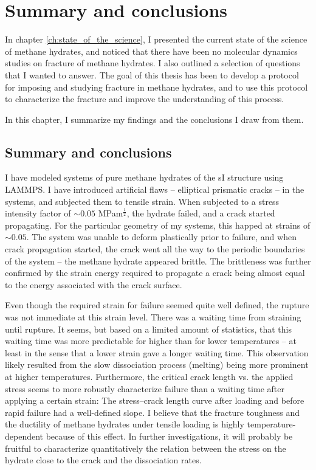 \chapter{Summary and conclusions}
\label{ch:summary_conclusions}
In chapter \ref{ch:state_of_the_science}, I presented the current state of the science of methane hydrates, and noticed that there have been no molecular dynamics studies on fracture of methane hydrates. I also outlined a selection of questions that I wanted to answer. The goal of this thesis has been to develop a protocol for imposing and studying fracture in methane hydrates, and to use this protocol to characterize the fracture and improve the understanding of this process. 

In this chapter, I summarize my findings and the conclusions I draw from them.

\section{Summary and conclusions}

I have modeled systems of pure methane hydrates of the sI structure using LAMMPS. I have introduced artificial flaws -- elliptical prismatic cracks -- in the systems, and subjected them to tensile strain. When subjected to a stress intensity factor of $\sim 0.05$ MPam$^{\frac{1}{2}}$, the hydrate failed, and a crack started propagating. For the particular geometry of my systems, this happed at strains of $\sim 0.05$. The system was unable to deform plastically prior to failure, and when crack propagation started, the crack went all the way to the periodic boundaries of the system -- the methane hydrate appeared brittle. The brittleness was further confirmed by the strain energy required to propagate a crack being almost equal to the energy associated with the crack surface. 

Even though the required strain for failure seemed quite well defined, the rupture was not immediate at this strain level. There was a waiting time from straining until rupture. It seems, but based on a limited amount of statistics, that this waiting time was more predictable for higher than for lower temperatures -- at least in the sense that a lower strain gave a longer waiting time. This observation likely resulted from the slow dissociation process (melting) being more prominent at higher temperatures.  Furthermore, the critical crack length vs. the applied stress seems to more robustly characterize failure than a waiting time after applying a certain strain: The stress--crack length curve after loading and before rapid failure had a well-defined slope. I believe that the fracture toughness and the ductility of methane hydrates under tensile loading is highly temperature-dependent because of this effect. In further investigations, it will probably be fruitful to characterize quantitatively the relation between the stress on the hydrate close to the crack and the dissociation rates. 


